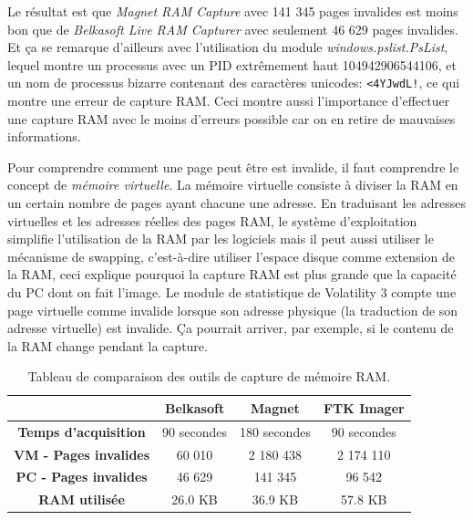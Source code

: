 Le résultat est que \textit{Magnet RAM Capture} avec 141 345 pages invalides est moins bon que de \textit{Belkasoft Live RAM Capturer} avec seulement 46 629 pages invalides. Et ça se remarque d'ailleurs avec l'utilisation du module \textit{windows.pslist.PsList}, lequel montre un processus avec un PID extrêmement haut 104942906544106, et un nom de processus bizarre contenant des caractères unicodes: \texttt{<4{\quem}YJ{\quem\quem}wd{\quem}L!\quem}, ce qui montre une erreur de capture RAM. Ceci montre aussi l'importance d'effectuer une capture RAM avec le moins d'erreurs possible car on en retire de mauvaises informations.

Pour comprendre comment une page peut être est invalide, il faut comprendre le concept de \textit{mémoire virtuelle}. La mémoire virtuelle consiste à diviser la RAM en un certain nombre de pages ayant chacune une adresse. En traduisant les adresses virtuelles et les adresses réelles des pages RAM, le système d'exploitation simplifie l'utilisation de la RAM par les logiciels mais il peut aussi utiliser le mécanisme de swapping, c'est-à-dire utiliser l'espace disque comme extension de la RAM, ceci explique pourquoi la capture RAM est plus grande que la capacité du PC dont on fait l'image. \cite{7} Le module de statistique de Volatility 3 compte une page virtuelle comme invalide lorsque son adresse physique (la traduction de son adresse virtuelle) est invalide. \cite{8} Ça pourrait arriver, par exemple, si le contenu de la RAM change pendant la capture.


\begin{table}
    \centering
    \begin{tabular}{cccc} \hline
            & \textbf{Belkasoft} & \textbf{Magnet} & \textbf{FTK Imager} \\ \hline
        \textbf{Temps d'acquisition}  & 90 secondes & 180 secondes & 90 secondes \\
        \textbf{VM - Pages invalides} & 60 010 & 2 180 438 & 2 174 110 \\
        \textbf{PC - Pages invalides} & 46 629 & 141 345 & 96 542 \\
        \textbf{RAM utilisée}         & 26.0 KB & 36.9 KB & 57.8 KB \\ \hline
    \end{tabular}
    \caption{Tableau de comparaison des outils de capture de mémoire RAM.}
    \label{tab:ram-capture}
\end{table}

